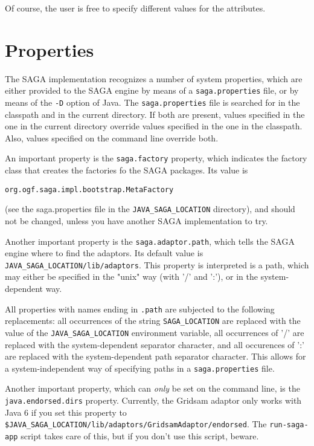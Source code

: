 \documentclass[a4paper,10pt]{article}
\begin{document}
Of course, the user is free to specify different values for the attributes.

\section{Properties}

The SAGA implementation recognizes a number of system properties, which
are either provided to the SAGA engine by means of a \texttt{saga.properties}
file, or by means of the \texttt{-D} option of Java.
The \texttt{saga.properties} file is searched for in the classpath and in
the current directory. If both are present, values specified in the one
in the current directory override values specified in the one in the
classpath. Also, values specified on the command line override both.

An important property is the \texttt{saga.factory} property, which
indicates the factory class that creates the factories fo the SAGA
packages.
Its value is
\noindent
{\small
\begin{verbatim}
org.ogf.saga.impl.bootstrap.MetaFactory
\end{verbatim}
}
\noindent
(see the saga.properties file in the
\texttt{JAVA\_SAGA\_LOCATION} directory), and
should not be changed, unless you have another SAGA implementation to try.

Another important property is the \texttt{saga.adaptor.path},
which tells the SAGA engine where to find the adaptors.
Its default value is \texttt{JAVA\_SAGA\_LOCATION/lib/adaptors}.
This property is interpreted is a path, which may either be specified in the
"unix" way (with '/' and ':'), or in the system-dependent way.

All properties with names ending in \texttt{.path} are subjected to
the following replacements: all occurrences of the string
\texttt{SAGA\_LOCATION} are replaced with the value of the
\texttt{JAVA\_SAGA\_LOCATION} environment variable, all occurrences
of '/' are replaced with the system-dependent separator character,
and all occurences of ':' are replaced with the system-dependent
path separator character. This allows for a system-independent way
of specifying paths in a \texttt{saga.properties} file.

Another important property, which can \emph{only} be set on the
command line, is the \texttt{java.endorsed.dirs} property. Currently,
the Gridsam adaptor only works with Java 6 if you set this property
to \texttt{\$JAVA\_SAGA\_LOCATION/lib/adaptors/GridsamAdaptor/endorsed}.
The \texttt{run-saga-app} script takes care of this, but if you don't
use this script, beware.
\end{document}
